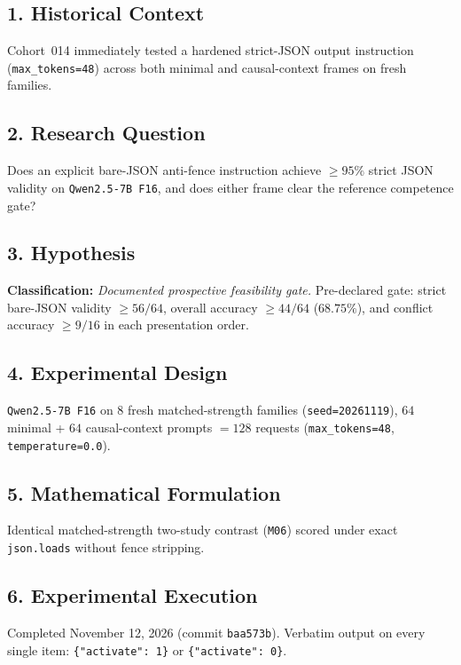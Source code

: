 \subsection*{1. Historical Context}
Cohort~014 immediately tested a hardened strict-JSON output instruction (\texttt{max\_tokens=48}) across both minimal and causal-context frames on fresh families.

\subsection*{2. Research Question}
Does an explicit bare-JSON anti-fence instruction achieve $\ge 95\%$ strict JSON validity on \texttt{Qwen2.5-7B F16}, and does either frame clear the reference competence gate?

\subsection*{3. Hypothesis}
\textbf{Classification:} \emph{Documented prospective feasibility gate.} Pre-declared gate: strict bare-JSON validity $\ge 56/64$, overall accuracy $\ge 44/64$ ($68.75\%$), and conflict accuracy $\ge 9/16$ in each presentation order.

\subsection*{4. Experimental Design}
\texttt{Qwen2.5-7B F16} on $8$ fresh matched-strength families (\texttt{seed=20261119}), $64$ minimal + $64$ causal-context prompts $= 128$ requests (\texttt{max\_tokens=48}, \texttt{temperature=0.0}).

\subsection*{5. Mathematical Formulation}
Identical matched-strength two-study contrast (\texttt{M06}) scored under exact \texttt{json.loads} without fence stripping.

\subsection*{6. Experimental Execution}
Completed November 12, 2026 (commit \texttt{baa573b}). Verbatim output on every single item: \texttt{\{"activate": 1\}} or \texttt{\{"activate": 0\}}.

